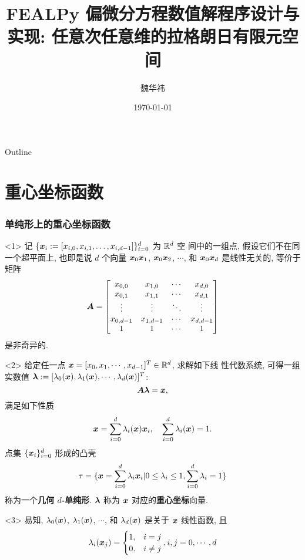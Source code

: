 \documentclass{beamer}
\title{FEALPy 偏微分方程数值解程序设计与实现: 
    {\bf 任意次任意维的拉格朗日有限元空间}}
\author{魏华祎}
\institute[XTU]{
weihuayi@xtu.edu.cn\\
\vspace{5pt}
湘潭大学$\bullet$数学与计算科学学院\\
}
\date[XTU]
{
    \today
}
\numberwithin{subsection}{section}
\begin{document}
\begin{frame}
  \titlepage
\end{frame}

\begin{frame}{Outline}
  \tableofcontents
\end{frame}

\section{重心坐标函数}
\begin{frame}
    \frametitle{单纯形上的重心坐标函数}
\begin{onlyenv}<1>
    记 $\{{\boldsymbol x}_i:=[x_{i,0}, x_{i, 1}, \ldots, x_{i, d-1}]\}_{i=0}^d$ 为 ${\mathbb R}^d$ 空
间中的一组点, 假设它们不在同一个超平面上, 也即是说 $d$ 个向量 ${\boldsymbol x}_0{\boldsymbol x}_1$,
${\boldsymbol x}_0{\boldsymbol x}_2$, $\cdots$, 和 ${\boldsymbol x}_0{\boldsymbol x}_d$ 是线性无关的, 等价于矩阵
\begin{equation*}
    {\boldsymbol A} =\begin{bmatrix}
        x_{0, 0} & x_{1, 0} & \cdots & x_{d, 0} \\
        x_{0, 1} & x_{1, 1} & \cdots & x_{d, 1} \\
        \vdots   & \vdots   & \ddots & \vdots \\
        x_{0, d-1} & x_{1, d-1} & \cdots & x_{d, d-1}\\
        1 & 1 & \cdots & 1
    \end{bmatrix}
\end{equation*}
是非奇异的.
\end{onlyenv}
\begin{onlyenv}<2>
    给定任一点 ${\boldsymbol x}=[x_0, x_1, \cdots, x_{d-1}]^T\in {\mathbb R}^d$, 求解如下线
性代数系统, 可得一组实数值 ${\bm \lambda} := [\lambda_0({\boldsymbol x}), \lambda_1({\boldsymbol x}),
\cdots, \lambda_d({\boldsymbol x})]^T$:
\begin{equation*}
    {\boldsymbol A} {\bm \lambda}= {\boldsymbol x}, 
\end{equation*}
满足如下性质
\begin{equation*}
    {\boldsymbol x} = \sum\limits_{i=0}^{d}\lambda_i({\boldsymbol x}) {\boldsymbol x}_i,
    \quad\sum\limits_{i=0}^{d}\lambda_i({\boldsymbol x}) = 1.
\end{equation*}
点集 $\{{\boldsymbol x}_i\}_{i=0}^d$ 形成的凸壳
\begin{equation*}
    \tau = \{{\boldsymbol x} = \sum_{i=0}^{d}\lambda_i{\boldsymbol x}_i | 0\leq \lambda_i \leq
    1, \sum_{i=0}^d\lambda_i = 1\}
\end{equation*}
称为一个{\bf 几何 $d$-单纯形}. ${\bm \lambda}$ 称为 ${\boldsymbol x}$ 对应的{\bf 重心坐标}向量.
\end{onlyenv}
\begin{onlyenv}<3>
易知, $\lambda_0({\boldsymbol x})$, $\lambda_1({\boldsymbol x})$, $\cdots$, 和 $\lambda_{d}({\boldsymbol x})$
是关于 ${\boldsymbol x}$ 线性函数, 且 
\begin{equation*}
    \lambda_i({\boldsymbol x}_j) = 
    \begin{cases}
        1, & i = j\\
        0, & i\not= j
    \end{cases}, 
    i, j = 0, \cdots, d
\end{equation*}
\end{onlyenv}
\end{frame}
\end{document}
